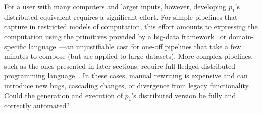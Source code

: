 \documentclass[sigplan,10pt,review,anonymous]{acmart}
\newcommand{\eg}{{\em e.g.}, }
\newcommand{\ttt}[1]{\texttt{\small #1}}
\begin{document}

For a user with many computers and larger inputs, however, developing $p_1$'s distributed equivalent requires a significant effort.
For simple pipelines that capture in restricted models of computation, this effort amounts to expressing the computation using the primitives provided by a big-data framework~\cite{mapreduce:08, ciel:11, spark:12, naiad:13} or domain-specific language~\cite{alvaro2011consistency, distal:13, meiklejohn2015lasp}---an unjustifiable cost for one-off pipelines that take a few minutes to compose (but are applied to large datasets).
More complex pipelines, such as the ones presented in later sections, require full-fledged distributed programming language~\cite{erlang:96, lopes1997d, acute:05, mace:07, cloudhaskell:11, ScalaLoci:18}. %
In these cases, manual rewriting is expensive and can introduce new bugs, cascading changes, or divergence from legacy functionality.
Could the generation and execution of $p_1$'s distributed version be fully and correctly automated?

% 
% 
% 
% 
% 
% 
% 
% 
\end{document}
